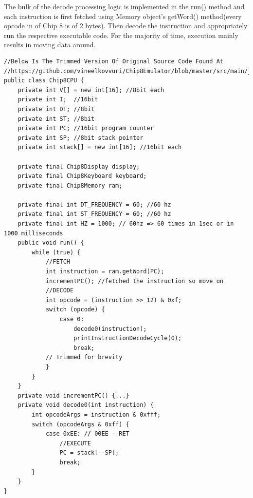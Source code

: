 \documentclass{article}
\begin{document}
The bulk of the decode processing logic is implemented in the run() method and each instruction is first fetched using Memory object’s getWord() method(every opcode in of Chip 8 is of 2 bytes). Then decode the instruction and appropriately run the respective executable code. For the majority of time, execution mainly results in moving data around.
\begin{verbatim}
//Below Is The Trimmed Version Of Original Source Code Found At
//https://github.com/vineelkovvuri/Chip8Emulator/blob/master/src/main/java/com/vineelkumarreddy/chip8/Chip8CPU.java
public class Chip8CPU {
    private int V[] = new int[16]; //8bit each
    private int I;  //16bit
    private int DT; //8bit
    private int ST; //8bit
    private int PC; //16bit program counter
    private int SP; //8bit stack pointer
    private int stack[] = new int[16]; //16bit each

    private final Chip8Display display;
    private final Chip8Keyboard keyboard;
    private final Chip8Memory ram;

    private final int DT_FREQUENCY = 60; //60 hz
    private final int ST_FREQUENCY = 60; //60 hz
    private final int HZ = 1000; // 60hz => 60 times in 1sec or in 1000 milliseconds
    public void run() {
        while (true) {
            //FETCH
            int instruction = ram.getWord(PC);
            incrementPC(); //fetched the instruction so move on
            //DECODE
            int opcode = (instruction >> 12) & 0xf;
            switch (opcode) {
                case 0:
                    decode0(instruction);
                    printInstructionDecodeCycle(0);
                    break;
            // Trimmed for brevity
            }
        }
    }
    private void incrementPC() {...}
    private void decode0(int instruction) {
        int opcodeArgs = instruction & 0xfff;
        switch (opcodeArgs & 0xff) {
            case 0xEE: // 00EE - RET
                //EXECUTE
                PC = stack[--SP];
                break;
        }
    }
}
\end{verbatim}
\end{document}
